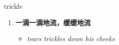 
\begin{frame}
{\huge trickle}
\begin{center}
\begin{enumerate}\Large
  \item \textbf{一滴一滴地流，缓缓地流}
  \begin{itemize}
    \item \em{\Large{tears trickles down his cheeks}}
  \end{itemize}
\end{enumerate}
\end{center}
\end{frame}
